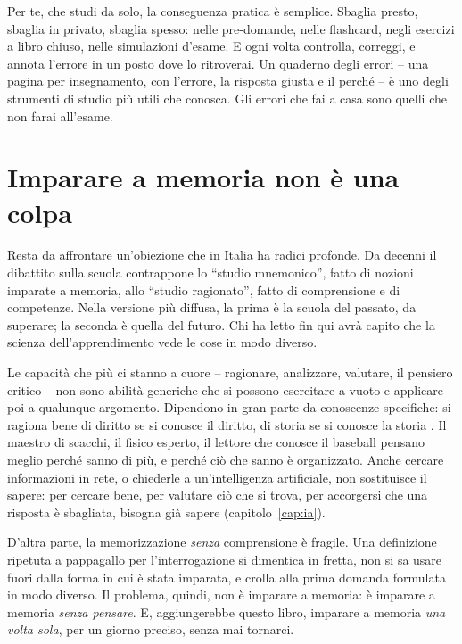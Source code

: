 Per te, che studi da solo, la conseguenza pratica è semplice. Sbaglia
presto, sbaglia in privato, sbaglia spesso: nelle pre-domande, nelle
flashcard, negli esercizi a libro chiuso, nelle simulazioni d'esame. E
ogni volta controlla, correggi, e annota l'errore in un posto dove lo
ritroverai. Un quaderno degli errori -- una pagina per insegnamento,
con l'errore, la risposta giusta e il perché -- è uno degli strumenti
di studio più utili che conosca. Gli errori che fai a casa sono quelli
che non farai all'esame.

\section{Imparare a memoria non è una colpa}

Resta da affrontare un'obiezione che in Italia ha radici profonde. Da
decenni il dibattito sulla scuola contrappone lo \enquote{studio
mnemonico}, fatto di nozioni imparate a memoria, allo \enquote{studio
ragionato}, fatto di comprensione e di competenze. Nella versione più
diffusa, la prima è la scuola del passato, da superare; la seconda è
quella del futuro. Chi ha letto fin qui avrà capito che la scienza
dell'apprendimento vede le cose in modo diverso.

Le capacità che più ci stanno a cuore -- ragionare, analizzare,
valutare, il pensiero critico -- non sono abilità generiche che si
possono esercitare a vuoto e applicare poi a qualunque argomento.
Dipendono in gran parte da conoscenze specifiche: si ragiona bene di
diritto se si conosce il diritto, di storia se si conosce la storia
\parencite{willingham2007}. Il maestro di scacchi, il fisico esperto, il
lettore che conosce il baseball pensano meglio perché sanno di più, e
perché ciò che sanno è organizzato. Anche cercare informazioni in rete,
o chiederle a un'intelligenza artificiale, non sostituisce il sapere:
per cercare bene, per valutare ciò che si trova, per accorgersi che una
risposta è sbagliata, bisogna già sapere (capitolo~\ref{cap:ia}).

D'altra parte, la memorizzazione \emph{senza} comprensione è fragile.
Una definizione ripetuta a pappagallo per l'interrogazione si dimentica
in fretta, non si sa usare fuori dalla forma in cui è stata imparata,
e crolla alla prima domanda formulata in modo diverso. Il problema,
quindi, non è imparare a memoria: è imparare a memoria \emph{senza
pensare}. E, aggiungerebbe questo libro, imparare a memoria \emph{una
volta sola}, per un giorno preciso, senza mai tornarci.

